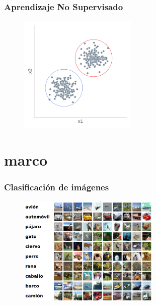 \documentclass{beamer}
\begin{document}
\begin{frame}
\frametitle{Aprendizaje No Supervisado}
\begin{figure}
    \centering
    \includegraphics[width=0.5\textwidth]{images/machinelearning2.pdf}
\end{figure}
\end{frame}





\section{marco}
\begin{frame}
\frametitle{Clasificación de imágenes}
\begin{figure}
    \centering
    \includegraphics[width=0.6\textwidth]{images/ciphar10.png}
\end{figure}
\end{frame}
\end{document}
